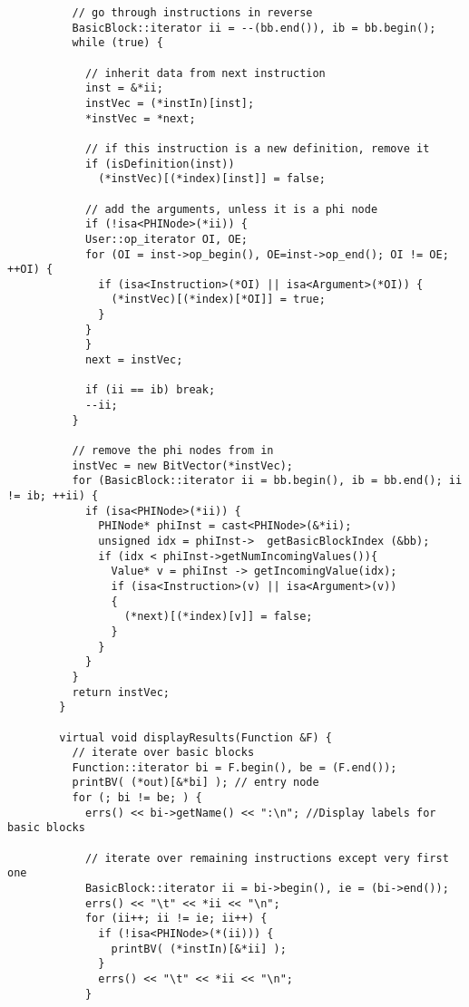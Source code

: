 \documentclass[12pt]{article}
\begin{document}
\begin{verbatim}
          // go through instructions in reverse
          BasicBlock::iterator ii = --(bb.end()), ib = bb.begin();
          while (true) {
            
            // inherit data from next instruction
            inst = &*ii;
            instVec = (*instIn)[inst];            
            *instVec = *next;
            
            // if this instruction is a new definition, remove it
            if (isDefinition(inst))
              (*instVec)[(*index)[inst]] = false;
                            
            // add the arguments, unless it is a phi node
            if (!isa<PHINode>(*ii)) {
            User::op_iterator OI, OE;
            for (OI = inst->op_begin(), OE=inst->op_end(); OI != OE; ++OI) {
              if (isa<Instruction>(*OI) || isa<Argument>(*OI)) {
                (*instVec)[(*index)[*OI]] = true;
              }
            }
            }
            next = instVec;

            if (ii == ib) break;
            --ii;
          }
          
          // remove the phi nodes from in 
          instVec = new BitVector(*instVec);
          for (BasicBlock::iterator ii = bb.begin(), ib = bb.end(); ii != ib; ++ii) {
            if (isa<PHINode>(*ii)) {
              PHINode* phiInst = cast<PHINode>(&*ii);
              unsigned idx = phiInst->  getBasicBlockIndex (&bb);
              if (idx < phiInst->getNumIncomingValues()){
                Value* v = phiInst -> getIncomingValue(idx);
                if (isa<Instruction>(v) || isa<Argument>(v))
                {
                  (*next)[(*index)[v]] = false;
                }
              }
            }
          }
          return instVec;
        }
        
        virtual void displayResults(Function &F) {
          // iterate over basic blocks
          Function::iterator bi = F.begin(), be = (F.end());
          printBV( (*out)[&*bi] ); // entry node
          for (; bi != be; ) {            
            errs() << bi->getName() << ":\n"; //Display labels for basic blocks
          
            // iterate over remaining instructions except very first one
            BasicBlock::iterator ii = bi->begin(), ie = (bi->end());
            errs() << "\t" << *ii << "\n";
            for (ii++; ii != ie; ii++) {
              if (!isa<PHINode>(*(ii))) {
                printBV( (*instIn)[&*ii] );
              }
              errs() << "\t" << *ii << "\n";
            }
            

\end{verbatim}
\end{document}
